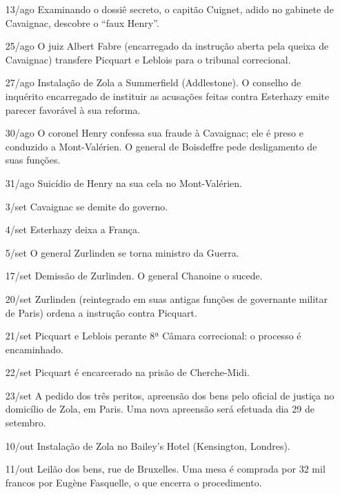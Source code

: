 \begin{itemize}
\item[13/ago] Examinando o dossiê secreto, o capitão Cuignet, adido no gabinete
de Cavaignac, descobre o ``faux Henry''.

\item[25/ago] O juiz Albert Fabre (encarregado da instrução aberta pela queixa
de Cavaignac) transfere Picquart e Leblois para o tribunal correcional.  
 
\item[27/ago] Instalação de Zola a Summerfield (Addlestone). O conselho de
inquérito encarregado de instituir as acusações feitas contra Esterhazy emite
parecer favorável à sua reforma. 

\item[30/ago] O coronel Henry confessa sua fraude à Cavaignac; ele é preso e
conduzido a Mont-Valérien. O general de Boisdeffre pede desligamento de suas
funções.

\item[31/ago] Suicídio de Henry na sua cela no Mont-Valérien.

\item[3/set ] Cavaignac se demite do governo.

\item[4/set] Esterhazy deixa a França.

\item[5/set] O general Zurlinden se torna ministro da Guerra.

\item[17/set] Demissão de Zurlinden. O general Chanoine o sucede.

\item[20/set] Zurlinden (reintegrado em suas antigas funções de governante
militar de Paris) ordena a instrução contra Picquart.

\item[21/set] Picquart e Leblois perante 8ª Câmara correcional: o processo é
encaminhado.

\item[22/set] Picquart é encarcerado na prisão de Cherche-Midi.

\item[23/set] A pedido dos três peritos, apreensão dos bens pelo oficial de
justiça no domicílio de Zola, em Paris. Uma nova apreensão será efetuada dia 29
de setembro.

\item[10/out] Instalação de Zola no Bailey's Hotel (Kensington, Londres).

\item[11/out] Leilão dos bens, rue de Bruxelles. Uma mesa é comprada por 32 mil
francos por Eugène Fasquelle, o que encerra o procedimento.


\end{itemize}
